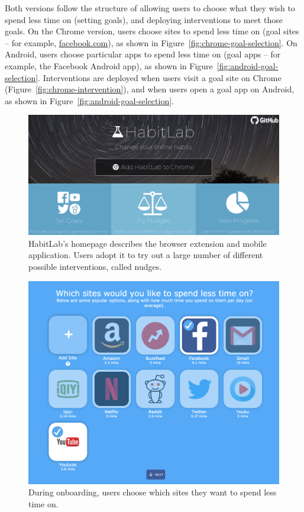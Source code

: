 Both versions follow the structure of allowing users to choose what they wish to spend less time on (setting goals), and deploying interventions to meet those goals. %
On the Chrome version, users choose sites to spend less time on (goal sites -- for example, \url{facebook.com}), as shown in Figure~\ref{fig:chrome-goal-selection}. On Android, users choose particular apps to spend less time on (goal apps -- for example, the Facebook Android app), as shown in Figure~\ref{fig:android-goal-selection}. Interventions are deployed when users visit a goal site on Chrome (Figure~\ref{fig:chrome-intervention}), and when users open a goal app on Android, as shown in Figure~\ref{fig:android-goal-selection}.

\begin{figure}
\includegraphics[width=\linewidth]{figures/homepage_cropped}
\caption{HabitLab's homepage describes the browser extension and mobile application. Users adopt it to try out a large number of different possible interventions, called nudges.}
\label{fig:homepage}
\end{figure}


\begin{figure}
\includegraphics[width=\linewidth]{figures/onboarding_sites}
\caption{During onboarding, users choose which sites they want to spend less time on.}
  \label{fig:onboarding_sites}
\end{figure}

